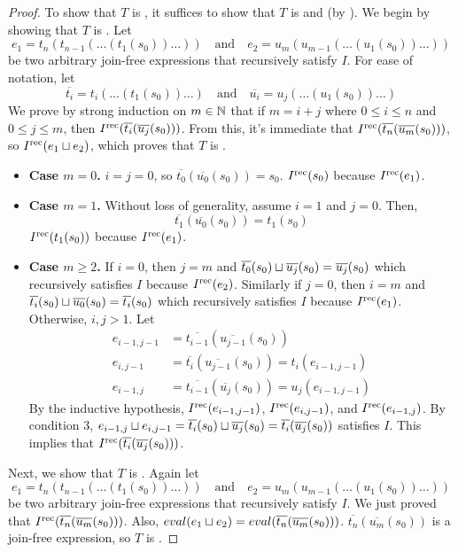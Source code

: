 \begin{proof}
  \newcommand{\bart}[1]{\overline{t_{#1}}}
  \newcommand{\baru}[1]{\overline{u_{#1}}}

  To show that $T$ is \Iconfluent{}, it suffices to show that $T$ is
  \dIconfluent{} and \dIreducible{} (by
  ). We begin by showing
  that $T$ is \dIconfluent{}. Let
  \[
    e_1 = t_n(t_{n-1}(\ldots (t_1(s_0))\ldots))
    \quad \text{and} \quad
    e_2 = u_m(u_{m-1}(\ldots (u_1(s_0))\ldots))
  \]
  be two arbitrary join-free expressions that recursively satisfy $I$. For ease
  of notation, let
  \[
    \bart{i} = t_i(\ldots(t_1(s_0))\ldots)
    \quad\text{and}\quad
    \baru{i} = u_j(\ldots(u_1(s_0))\ldots)
  \]
  We prove by strong induction on $m \in \mathbb{N}$ that if $m = i + j$ where $0
  \leq i \leq n$ and $0 \leq j \leq m$, then $\Irec{\bart{i}(\baru{j}(s_0))}$.
  From this, it's immediate that $\Irec{\bart{n}(\baru{m}(s_0))}$, so
  $I^{\text{rec}}(e_1 \sqcup e_2)$, which proves that $T$ is \dIconfluent{}.
  \begin{itemize}
    \item \textbf{Case $m = 0$.}
      $i = j = 0$, so $\bart{0}(\baru{0}(s_0)) = s_0$. $I^{\text{rec}}(s_0)$ because
      $I^{\text{rec}}(e_1)$.

    \item \textbf{Case $m = 1$.}
      Without loss of generality, assume $i = 1$ and $j = 0$. Then,
      \[
        \bart{1}(\baru{0}(s_0))
          = t_1(s_0)
      \]
      $I^{\text{rec}}(t_1(s_0))$ because $I^{\text{rec}}(e_1)$.

    \item \textbf{Case $m \geq 2$.}
      If $i = 0$, then $j = m$ and $\bart{0}(s_0) \join \baru{j}(s_0) =
      \baru{j}(s_0)$ which recursively satisfies $I$ because $I^{\text{rec}}(e_2)$.
      Similarly if $j = 0$, then $i = m$ and $\bart{i}(s_0) \join \baru{0}(s_0)
      = \bart{i}(s_0)$ which recursively satisfies $I$ because $I^{\text{rec}}(e_1)$.
      Otherwise, $i, j > 1$. Let
      \begin{align*}
        e_{i-1,j-1}
          &= \bart{i-1}(\baru{j-1}(s_0)) \\
        e_{i,j-1}
          &= \bart{i}(\baru{j-1}(s_0))
           = t_i(e_{i-1,j-1}) \\
        e_{i-1,j}
          &= \bart{i-1}(\baru{j}(s_0))
           = u_j(e_{i-1,j-1})
      \end{align*}
      By the inductive hypothesis, $I^{\text{rec}}(e_{i-1,j-1})$, $I^{\text{rec}}(e_{i,j-1})$,
      and $I^{\text{rec}}(e_{i-1,j})$. By condition 3, $e_{i-1,j} \join e_{i,j-1} =
      \bart{i}(s_0) \join \baru{j}(s_0) = \bart{i}(\baru{j}(s_0))$ satisfies
      $I$. This implies that $\Irec{\bart{i}(\baru{j}(s_0))}$.
  \end{itemize}

  Next, we show that $T$ is \dIreducible{}. Again let
  \[
    e_1 = t_n(t_{n-1}(\ldots (t_1(s_0))\ldots))
    \quad \text{and} \quad
    e_2 = u_m(u_{m-1}(\ldots (u_1(s_0))\ldots))
  \]
  be two arbitrary join-free expressions that recursively satisfy $I$. We just
  proved that $\Irec{\bart{n}(\baru{m}(s_0))}$. Also, $eval(e_1 \join e_2) =
  eval(\bart{n}(\baru{m}(s_0)))$. $\bart{n}(\baru{m}(s_0))$ is a join-free
  expression, so $T$ is \dIreducible{}.
\end{proof}
